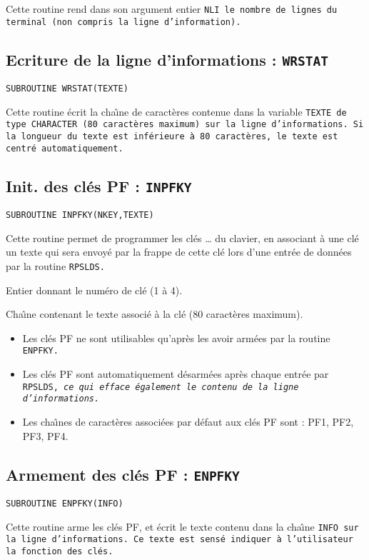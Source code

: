 \documentclass[a4paper,12pt,titlepage]{article}
\newcommand{\darg}[1]{\item[\tt #1\rm]}
\newcommand{\fsub}[1]{\hbox {\tt SUBROUTINE #1  } \medskip }
\newenvironment{argdesc}{\begin{list}{-}{\leftmargin 8em \labelwidth 7em}}%
{\end{list}}
\begin{document}
Cette routine rend dans son argument entier \tt NLI\rm\ le nombre de lignes
du terminal (non compris la ligne d'information).

\subsection{Ecriture de la ligne d'informations : \tt WRSTAT}
\fsub{WRSTAT(TEXTE)}

Cette routine \'ecrit la cha\^{\i}ne de caract\`eres contenue dans la
variable \tt TEXTE\rm\ de type \tt CHA\-RAC\-TER\rm\ (80 caract\`eres maximum)
sur la ligne d'informations. Si la longueur du texte est inf\'erieure \`a 80
caract\`eres, le texte est centr\'e automatiquement.

\subsection{Init. des cl\'es PF : \tt INPFKY}
\fsub{INPFKY(NKEY,TEXTE)}

Cette routine permet de programmer les cl\'es  \ldots
{} du clavier, en associant \`a une cl\'e un texte qui sera
envoy\'e par la frappe de cette cl\'e lors d'une entr\'ee de donn\'ees par
la routine \tt RPSLDS\rm.
\begin{argdesc}
    \darg{NKEY :} Entier donnant le num\'ero de cl\'e (1 \`a 4).
    \darg{TEXTE :} Cha\^{\i}ne contenant le texte associ\'e \`a la cl\'e (80
                    caract\`eres maximum).
\end{argdesc}

\begin{itemize}
    \item Les cl\'es PF ne sont utilisables qu'apr\`es les avoir arm\'ees par
la routine \tt ENPFKY\rm.
    \item Les cl\'es PF sont automatiquement d\'esarm\'ees apr\`es chaque
entr\'ee par \tt RPSLDS\rm, \em ce qui efface \'egalement le contenu de la
ligne d'informations\em.
    \item Les cha\^{\i}nes de caract\`eres associ\'ees par d\'efaut aux cl\'es PF
sont :  PF1, PF2, PF3, PF4.
\end{itemize}

\subsection{Armement des cl\'es PF : \tt ENPFKY}
\fsub{ENPFKY(INFO)}

Cette routine arme les cl\'es PF, et \'ecrit le texte contenu dans la
cha\^{\i}ne
\tt INFO\rm\ sur la ligne d'in\-for\-ma\-tions. Ce texte est sens\'e
indiquer \`a l'utilisateur la fonction des cl\'es.
 
\end{document}
